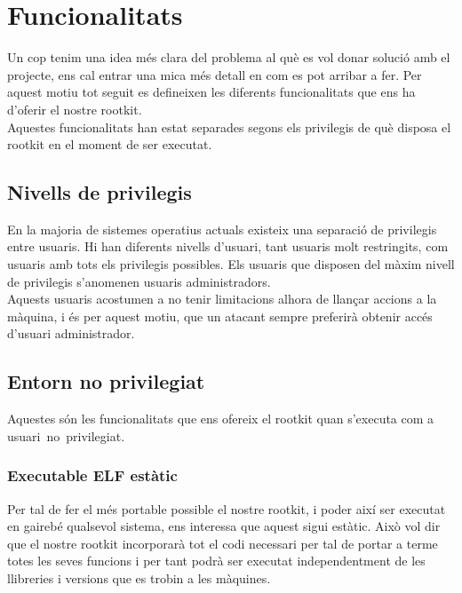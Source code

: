 \chapter{Funcionalitats} \label{cap:funcionalitats}

Un cop tenim una idea més clara del problema al què es vol donar solució amb el projecte, ens cal entrar una mica més
detall en com es pot arribar a fer. Per aquest motiu tot seguit es defineixen les diferents funcionalitats 
que ens ha d'oferir el nostre rootkit. \\

Aquestes funcionalitats han estat separades segons els privilegis de què disposa el rootkit en el moment de ser
executat.

\section{Nivells de privilegis}

En la majoria de sistemes operatius actuals existeix una separació de privilegis entre usuaris. Hi
han diferents nivells d'usuari, tant usuaris molt restringits, com usuaris amb tots els privilegis
possibles. Els usuaris que disposen del màxim nivell de privilegis s'anomenen usuaris administradors. \\
Aquests usuaris acostumen a no tenir limitacions alhora de llançar accions a la màquina, i és per aquest
motiu, que un atacant sempre preferirà obtenir accés d'usuari administrador. \\

\section{Entorn no privilegiat}

Aquestes són les funcionalitats que ens ofereix el rootkit quan s'executa com a \mbox{usuari no privilegiat}.

\subsection{Executable ELF estàtic}
Per tal de fer el més portable possible el nostre rootkit, i poder així ser executat en gairebé qualsevol sistema, ens 
interessa que aquest sigui estàtic. Això vol dir que el nostre rootkit incorporarà tot el codi necessari per tal de portar 
a terme totes les seves funcions i per tant podrà ser executat independentment de les llibreries i versions que es trobin a
les màquines. \\

